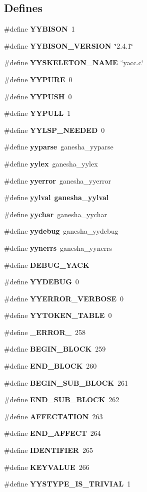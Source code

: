 \subsection*{Defines}
\begin{DoxyCompactItemize}
\item 
\#define {\bf YYBISON}~1
\item 
\#define {\bf YYBISON\_\-VERSION}~\char`\"{}2.4.1\char`\"{}
\item 
\#define {\bf YYSKELETON\_\-NAME}~\char`\"{}yacc.c\char`\"{}
\item 
\#define {\bf YYPURE}~0
\item 
\#define {\bf YYPUSH}~0
\item 
\#define {\bf YYPULL}~1
\item 
\#define {\bf YYLSP\_\-NEEDED}~0
\item 
\#define {\bf yyparse}~ganesha\_\-yyparse
\item 
\#define {\bf yylex}~ganesha\_\-yylex
\item 
\#define {\bf yyerror}~ganesha\_\-yyerror
\item 
\#define {\bf yylval}~{\bf ganesha\_\-yylval}
\item 
\#define {\bf yychar}~ganesha\_\-yychar
\item 
\#define {\bf yydebug}~ganesha\_\-yydebug
\item 
\#define {\bf yynerrs}~ganesha\_\-yynerrs
\item 
\#define {\bf DEBUG\_\-YACK}
\item 
\#define {\bf YYDEBUG}~0
\item 
\#define {\bf YYERROR\_\-VERBOSE}~0
\item 
\#define {\bf YYTOKEN\_\-TABLE}~0
\item 
\#define {\bf \_\-ERROR\_\-}~258
\item 
\#define {\bf BEGIN\_\-BLOCK}~259
\item 
\#define {\bf END\_\-BLOCK}~260
\item 
\#define {\bf BEGIN\_\-SUB\_\-BLOCK}~261
\item 
\#define {\bf END\_\-SUB\_\-BLOCK}~262
\item 
\#define {\bf AFFECTATION}~263
\item 
\#define {\bf END\_\-AFFECT}~264
\item 
\#define {\bf IDENTIFIER}~265
\item 
\#define {\bf KEYVALUE}~266
\item 
\#define {\bf YYSTYPE\_\-IS\_\-TRIVIAL}~1
\item 

\end{DoxyCompactItemize}
